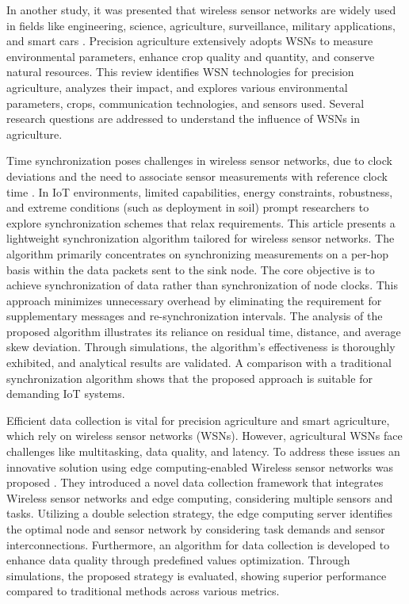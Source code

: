 In another study, it was presented that wireless sensor networks are widely used in fields like engineering, science, agriculture, surveillance, military applications, and smart cars \cite{thakur2019applicability}. Precision agriculture extensively adopts WSNs to measure environmental parameters, enhance crop quality and quantity, and conserve natural resources. This review identifies WSN technologies for precision agriculture, analyzes their impact, and explores various environmental parameters, crops, communication technologies, and sensors used. Several research questions are addressed to understand the influence of WSNs in agriculture.

Time synchronization poses challenges in wireless sensor networks, due to clock deviations and the need to associate sensor measurements with reference clock time \cite{skiadopoulos2019synchronization}. In IoT environments, limited capabilities, energy constraints, robustness, and 
extreme conditions (such as deployment in soil) prompt researchers to explore synchronization schemes that relax requirements. This article presents a lightweight synchronization algorithm tailored for wireless sensor networks. The algorithm primarily concentrates on synchronizing measurements on a per-hop basis within the data packets sent to the sink node. The core objective is to achieve synchronization of data rather than synchronization of node clocks. This approach minimizes unnecessary overhead by eliminating the requirement for supplementary messages and re-synchronization intervals. The analysis of the proposed algorithm illustrates its reliance on residual time, distance, and average skew deviation. Through simulations, the algorithm's effectiveness is thoroughly exhibited, and analytical results are validated. A comparison with a traditional synchronization algorithm shows that the proposed approach is suitable for demanding IoT systems.

Efficient data collection is vital for precision agriculture and smart agriculture, which rely on wireless sensor networks (WSNs). However, agricultural WSNs face challenges like multitasking, data quality, and latency. To address these issues an innovative solution using edge computing-enabled Wireless sensor networks was proposed \cite{li2020edge}. They introduced a novel data collection framework that integrates Wireless sensor networks and edge computing, considering multiple sensors and tasks. Utilizing a double selection strategy, the edge computing server identifies the optimal node and sensor network by considering task demands and sensor interconnections. Furthermore, an algorithm for data collection is developed to enhance data quality through predefined values optimization. Through simulations, the proposed strategy is evaluated, showing superior performance compared to traditional methods across various metrics.

